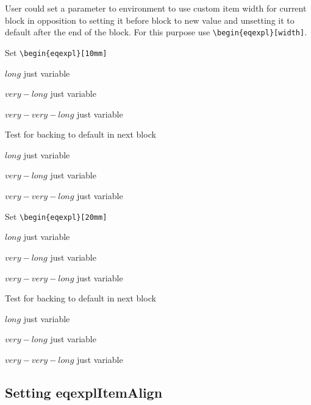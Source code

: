 \documentclass{article}
\begin{document}
User could set a parameter to environment to use custom item width for
current block in opposition to setting it before block to new value
and unsetting it to default after the end of the block.  For this
purpose use \verb+\begin{eqexpl}[width]+.

\noindent Set \verb+\begin{eqexpl}[10mm]+

\begin{eqexpl}[10mm]
  \item{$long$} just variable
  \item{$very-long$} just variable
  \item{$very-very-long$} just variable
\end{eqexpl}

\vspace{5mm}

\noindent Test for backing to default in next block

\begin{eqexpl}
  \item{$long$} just variable
  \item{$very-long$} just variable
  \item{$very-very-long$} just variable
\end{eqexpl}

\vspace{5mm}

\noindent Set \verb+\begin{eqexpl}[20mm]+

\begin{eqexpl}[20mm]
  \item{$long$} just variable
  \item{$very-long$} just variable
  \item{$very-very-long$} just variable
\end{eqexpl}

\vspace{5mm}

\noindent Test for backing to default in next block

\begin{eqexpl}
  \item{$long$} just variable
  \item{$very-long$} just variable
  \item{$very-very-long$} just variable
\end{eqexpl}

\subsection{Setting eqexplItemAlign}
\end{document}
